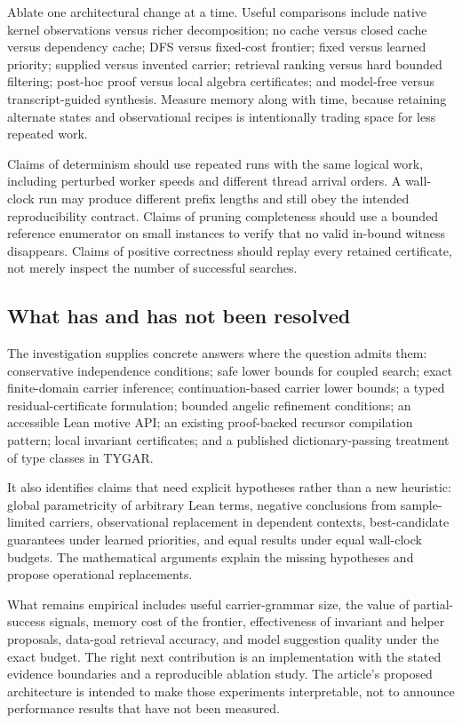Ablate one architectural change at a time. Useful comparisons include native kernel observations versus richer decomposition; no cache versus closed cache versus dependency cache; DFS versus fixed-cost frontier; fixed versus learned priority; supplied versus invented carrier; retrieval ranking versus hard bounded filtering; post-hoc proof versus local algebra certificates; and model-free versus transcript-guided synthesis. Measure memory along with time, because retaining alternate states and observational recipes is intentionally trading space for less repeated work.

Claims of determinism should use repeated runs with the same logical work, including perturbed worker speeds and different thread arrival orders. A wall-clock run may produce different prefix lengths and still obey the intended reproducibility contract. Claims of pruning completeness should use a bounded reference enumerator on small instances to verify that no valid in-bound witness disappears. Claims of positive correctness should replay every retained certificate, not merely inspect the number of successful searches.

\subsection{What has and has not been resolved}

The investigation supplies concrete answers where the question admits them: conservative independence conditions; safe lower bounds for coupled search; exact finite-domain carrier inference; continuation-based carrier lower bounds; a typed residual-certificate formulation; bounded angelic refinement conditions; an accessible Lean motive API; an existing proof-backed recursor compilation pattern; local invariant certificates; and a published dictionary-passing treatment of type classes in TYGAR.

It also identifies claims that need explicit hypotheses rather than a new heuristic: global parametricity of arbitrary Lean terms, negative conclusions from sample-limited carriers, observational replacement in dependent contexts, best-candidate guarantees under learned priorities, and equal results under equal wall-clock budgets. The mathematical arguments explain the missing hypotheses and propose operational replacements.

What remains empirical includes useful carrier-grammar size, the value of partial-success signals, memory cost of the frontier, effectiveness of invariant and helper proposals, data-goal retrieval accuracy, and model suggestion quality under the exact budget. The right next contribution is an implementation with the stated evidence boundaries and a reproducible ablation study. The article's proposed architecture is intended to make those experiments interpretable, not to announce performance results that have not been measured.

